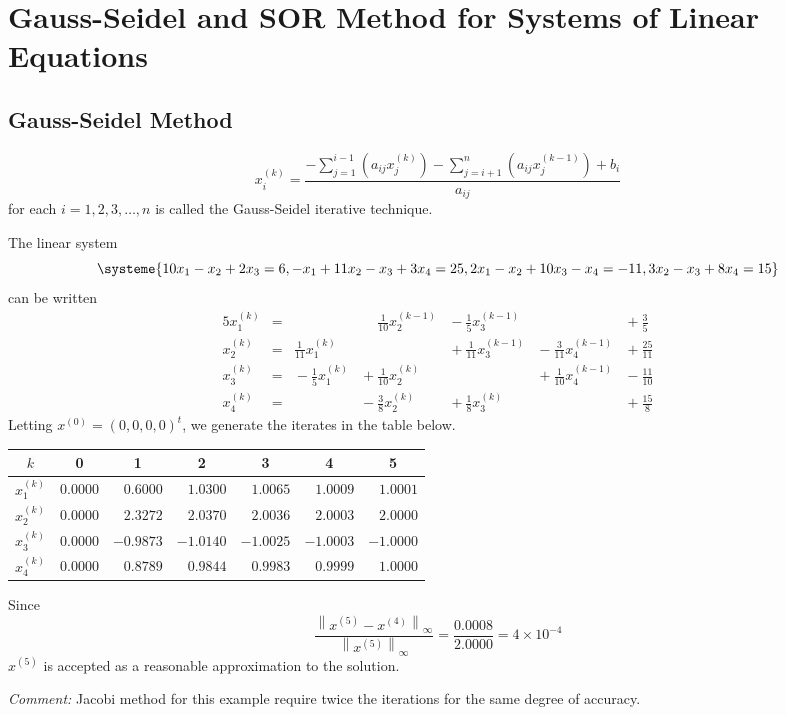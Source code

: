 \documentclass[../main-sheet.tex]{subfiles}
\begin{document}
\chapter{Gauss-Seidel and SOR Method for Systems of Linear Equations}
\section{Gauss-Seidel Method}
\[
    x_i^{(k)}=\frac{-\sum_{j=1}^{i-1} \left( a_{ij}x_j^{(k)} \right)-\sum_{j=i+1}^{n} \left( a_{ij}x_j^{(k-1)} \right)+b_i}{a_{ij}}
\]
for each \(i=1,2,3,\dots,n \) is called the Gauss-Seidel iterative technique.
\begin{ex}
    The linear system
    \[\systeme{
        10x_1 - x_2 + 2x_3=6,
        -x_1 + 11x_2 - x_3 + 3x_4=25,
        2x_1 - x_2 + 10x_3 - x_4=-11,
        3x_2 - x_3 + 8x_4=15
        }
    \]
    can be written
    \begin{alignat*}{5}
        x_1^{(k)} & {}={} &  & \phantom{+} \frac{1}{10}x_2^{(k-1)} & {}-{} \frac{1}{5}x_3^{(k-1)} & & {}+{} \frac{3}{5}\\
        x_2^{(k)} & {}={} & \frac{1}{11}x_1^{(k)} & & {}+{} \frac{1}{11}x_3^{(k-1)}& {}-{} \frac{3}{11}x_4^{(k-1)} & {}+{} \frac{25}{11}\\
        x_3^{(k)} & {}={} & {}-{} \frac{1}{5}x_1^{(k)} & {}+{} \frac{1}{10}x_2^{(k)} & & {}+{} \frac{1}{10}x_4^{(k-1)} & {}-{} \frac{11}{10}\\
        x_4^{(k)} & {}={} & & {}-{} \frac{3}{8}x_2^{(k)} & {}+{} \frac{1}{8}x_3^{(k)} & & {}+{} \frac{15}{8}
    \end{alignat*}
    Letting \(x^{(0)}=(0,0,0,0)^t\), we generate the iterates in the table below.
    \begin{table}[H]
        \centering
        \begin{tabular}{crrrrrr}
        \toprule
        \(k\) & \multicolumn{1}{c}{0} & \multicolumn{1}{c}{1} & \multicolumn{1}{c}{2} & \multicolumn{1}{c}{3} & \multicolumn{1}{c}{4} & \multicolumn{1}{c}{5} \\ \midrule
        \(x_1^{(k)}\) & \(0.0000\) & \(0.6000\)  & \(1.0300\) & \(1.0065\) & \(1.0009\) & \(1.0001\) \\
        \(x_2^{(k)}\) & \(0.0000\) & \(2.3272\)  & \(2.0370\) & \(2.0036\) & \(2.0003\) & \(2.0000\) \\
        \(x_3^{(k)}\) & \(0.0000\) & \(-0.9873\) & \(-1.0140\) & \(-1.0025\) & \(-1.0003\) & \(-1.0000\) \\
        \(x_4^{(k)}\) & \(0.0000\) & \(0.8789\)  & \(0.9844\) & \(0.9983\) & \(0.9999\) & \(1.0000\) \\ \bottomrule
        \end{tabular}
    \end{table}
    Since
    \[
        \frac{\left\| x^{(5)}-x^{(4)} \right\|_{\infty}}{\left\| x^{(5)}\right\|_{\infty}}=\frac{0.0008}{2.0000}=4\times 10^{-4}
    \]
    \(x^{(5)}\) is accepted as a reasonable approximation to the solution.
\end{ex}
    \emph{Comment: } Jacobi method for this example require twice the iterations for the same degree of accuracy.
\end{document}
